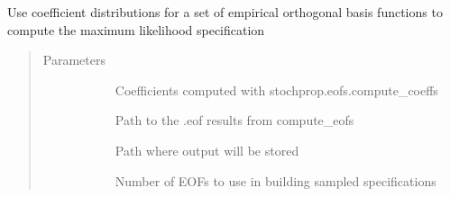 \documentclass[letterpaper,10pt,english]{sphinxmanual}
\begin{document}
\begin{fulllineitems}
\label{\detokenize{stochprop.eofs:stochprop.eofs.maximum_likelihood_profile}}
\sphinxAtStartPar
Use coefficient distributions for a set of empirical orthogonal
basis functions to compute the maximum likelihood specification
\begin{quote}\begin{description}
\item[{Parameters}] \leavevmode\begin{description}
\item[{}] \leavevmode
\sphinxAtStartPar
Coefficients computed with stochprop.eofs.compute\_coeffs

\item[{}] \leavevmode
\sphinxAtStartPar
Path to the .eof results from compute\_eofs

\item[{}] \leavevmode
\sphinxAtStartPar
Path where output will be stored

\item[{}] \leavevmode
\sphinxAtStartPar
Number of EOFs to use in building sampled specifications

\end{description}

\end{description}\end{quote}

\end{fulllineitems}

\end{document}
